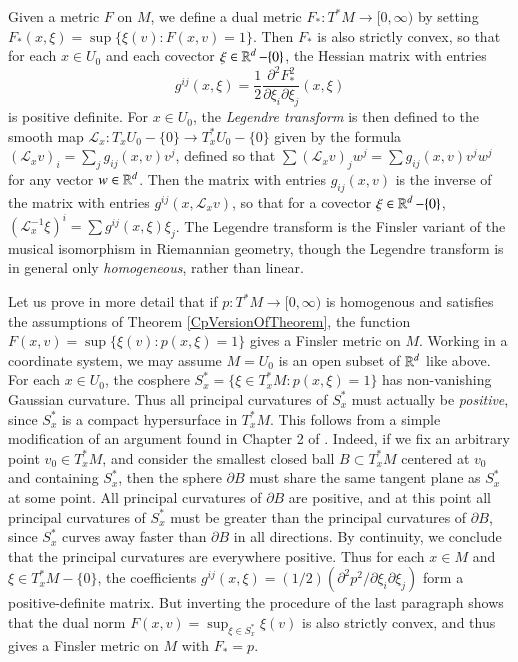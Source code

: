 Given a metric $F$ on $M$, we define a dual metric $F_*: T^*M \to [0,\infty)$ by setting $F_*(x,\xi) = \sup \{ \xi(v) : F(x,v) = 1 \}$. Then $F_*$ is also strictly convex, so that for each $x \in U_0$ and each covector $\xi \in \operatorname{\mathbb{R}}^d - \{ 0 \}$, the Hessian matrix with entries
%
\begin{equation}
    g^{ij}(x,\xi) = \frac{1}{2} \frac{\partial^2 F_*^2}{\partial \xi_i \partial \xi_j}(x,\xi)
\end{equation}
%
is positive definite. For $x \in U_0$, the \emph{Legendre transform} is then defined to the smooth map $\mathcal{L}_x: T_x U_0 - \{ 0 \} \to T^*_x U_0 - \{ 0 \}$ given by the formula $(\mathcal{L}_x v)_i = \sum_j g_{ij}(x,v) v^j$, defined so that $\sum (\mathcal{L}_x v)_j w^j = \sum g_{ij}(x,v) v^j w^j$ for any vector $w \in \operatorname{\mathbb{R}}^d$. Then the matrix with entries $g_{ij}(x,v)$ is the inverse of the matrix with entries $g^{ij}(x, \mathcal{L}_x v)$, so that for a covector $\xi \in \operatorname{\mathbb{R}}^d - \{ 0 \}$, $(\mathcal{L}_x^{-1} \xi)^i = \sum g^{ij}(x,\xi) \xi_j$. The Legendre transform is the Finsler variant of the musical isomorphism in Riemannian geometry, though the Legendre transform is in general only \emph{homogeneous}, rather than linear.

Let us prove in more detail that if $p: T^*M \to [0,\infty)$ is homogenous and satisfies the assumptions of Theorem \ref{CpVersionOfTheorem}, the function $F(x,v) = \sup \{ \xi(v): p(x,\xi) = 1 \}$ gives a Finsler metric on $M$. Working in a coordinate system, we may assume $M = U_0$ is an open subset of $\operatorname{\mathbb{R}}^d$ like above. For each $x \in U_0$, the cosphere $S_x^* = \{ \xi \in T_x^* M : p(x,\xi) = 1 \}$ has non-vanishing Gaussian curvature. Thus all principal curvatures of $S_x^*$ must actually be \emph{positive}, since $S_x^*$ is a compact hypersurface in $T^*_x M$. This follows from a simple modification of an argument found in Chapter 2 of \cite{HeinzHopf}. Indeed, if we fix an arbitrary point $v_0 \in T_x^*M$, and consider the smallest closed ball $B \subset T_x^* M$ centered at $v_0$ and containing $S_x^*$, then the sphere $\partial B$ must share the same tangent plane as $S_x^*$ at some point. All principal curvatures of $\partial B$ are positive, and at this point all principal curvatures of $S_x^*$ must be greater than the principal curvatures of $\partial B$, since $S_x^*$ curves away faster than $\partial B$ in all directions. By continuity, we conclude that the principal curvatures are everywhere positive.  Thus for each $x \in M$ and $\xi \in T_x^* M - \{ 0 \}$, the coefficients $g^{ij}(x,\xi) = (1/2) (\partial^2 p^2 / \partial \xi_i \partial \xi_j)$ form a positive-definite matrix. But inverting the procedure of the last paragraph shows that the dual norm $F(x,v) = \sup\nolimits_{\xi \in S_x^*} \xi(v)$ is also strictly convex, and thus gives a Finsler metric on $M$ with $F_* = p$. %

